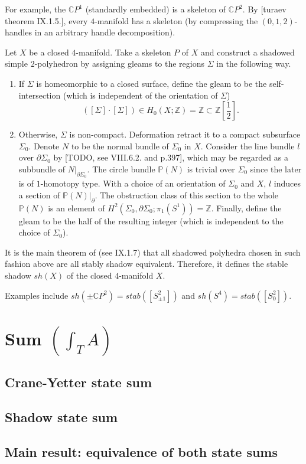 \noindent For example, the $\mathbb{C}P^{1}$ (standardly
embedded) is a skeleton of $\mathbb{C}P^{2}$. By [turaev theorem
IX.1.5.], every $4$-manifold has a skeleton (by compressing the
$(0,1,2)$-handles in an arbitrary handle decomposition).

\begin{definition}\label{def/stable-shadow-of-a-4-manifold}
  Let $X$ be a closed $4$-manifold. Take a skeleton $P$ of $X$
  and construct a shadowed simple $2$-polyhedron by assigning
  gleams to the regions $\Sigma$ in the following way.
  \begin{enumerate}
    \item If $\Sigma$ is homeomorphic to a closed surface, define
          the gleam to be the self-intersection (which is
          independent of the orientation of $\Sigma$)
          $$([\Sigma] \cdot [\Sigma]) \in H_{0}(X;\mathbb{Z}) = \mathbb{Z} \subset \mathbb{Z}[\frac{1}{2}].$$
    \item Otherwise, $\Sigma$ is non-compact. Deformation retract
          it to a compact subsurface $\Sigma_{0}$. Denote $N$ to
          be the normal bundle of $\Sigma_{0}$ in $X$. Consider
          the line bundle $l$ over $\partial \Sigma_{0}$ by
          [TODO, see VIII.6.2. and p.397], which may be regarded
          as a subbundle of $N|_{\partial \Sigma_{0}}$. The
          circle bundle $\mathbb{P}(N)$ is trivial over
          $\Sigma_{0}$ since the later is of $1$-homotopy type.
          With a choice of an orientation of $\Sigma_{0}$ and
          $X$, $l$ induces a section of
          $\mathbb{P}(N)|_{\partial}$. The obstruction class of
          this section to the whole $\mathbb{P}(N)$ is an element
          of
          $H^{2}(\Sigma_{0}, \partial \Sigma_{0}; \pi_{1}(S^{1})) = \mathbb{Z}$.
          Finally, define the gleam to be the half of the
          resulting integer (which is independent to the choice
          of $\Sigma_{0}$).
  \end{enumerate}
  It is the main theorem of \cite[chapter IX]{turaev} (see
  IX.1.7) that all shadowed polyhedra chosen in such fashion
  above are all stably shadow equivalent. Therefore, it defines
  the stable shadow $sh(X)$ of the closed $4$-manifold $X$.
\end{definition}

\noindent Examples include
$sh(\pm\mathbb{C}P^{2}) = stab([S^{2}_{\pm 1}])$ and
$sh(S^{4}) = stab([S^{2}_{0}])$.

\section{Sum $\left( \int_{T}{A} \right)$}
\subsection{Crane-Yetter state sum}
\subsection{Shadow state sum}
\subsection{Main result: equivalence of both state sums}
